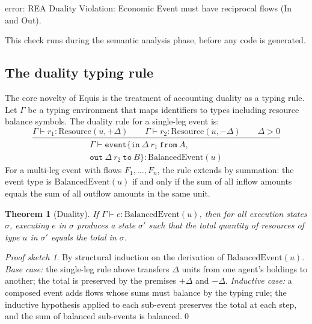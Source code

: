 \documentclass[11pt,a4paper]{article}
\newtheorem{theorem}{Theorem}[section]
\theoremstyle{remark}
\newtheorem*{proofsketch}{Proof sketch}
\begin{document}
\begin{plaincode}
error: REA Duality Violation: Economic Event must have reciprocal
       flows (In and Out).
\end{plaincode}

This check runs during the semantic analysis phase, before any code is
generated.

\subsection{The duality typing rule}\label{sec:design:duality}

The core novelty of Equis is the treatment of accounting duality as a
typing rule. Let $\Gamma$ be a typing environment that maps identifiers
to types including resource balance symbols. The duality rule for a
single-leg event is:
\[
\dfrac{
  \Gamma \vdash r_1 : \mathrm{Resource}(u, +\Delta) \qquad
  \Gamma \vdash r_2 : \mathrm{Resource}(u, -\Delta) \qquad
  \Delta > 0
}{
  \begin{gathered}
  \Gamma \vdash \texttt{event}\{ \texttt{in}\ \Delta\ r_1\ \texttt{from}\ A, \\
  \texttt{out}\ \Delta\ r_2\ \texttt{to}\ B \} : \mathrm{BalancedEvent}(u)
  \end{gathered}
}
\]
For a multi-leg event with flows $F_1,\ldots,F_n$, the rule extends by
summation: the event type is $\mathrm{BalancedEvent}(u)$ if and only if
the sum of all inflow amounts equals the sum of all outflow amounts in
the same unit.

\begin{theorem}[Duality]\label{thm:duality}
If $\Gamma \vdash e : \mathrm{BalancedEvent}(u)$, then for all execution
states $\sigma$, executing $e$ in $\sigma$ produces a state $\sigma'$
such that the total quantity of resources of type $u$ in $\sigma'$
equals the total in $\sigma$.
\end{theorem}

\begin{proofsketch}
By structural induction on the derivation of
$\mathrm{BalancedEvent}(u)$. \emph{Base case:} the single-leg rule above
transfers $\Delta$ units from one agent's holdings to another; the total
is preserved by the premises $+\Delta$ and $-\Delta$. \emph{Inductive
case:} a composed event adds flows whose sums must balance by the typing
rule; the inductive hypothesis applied to each sub-event preserves the
total at each step, and the sum of balanced sub-events is balanced.\qed
\end{proofsketch}
\end{document}

